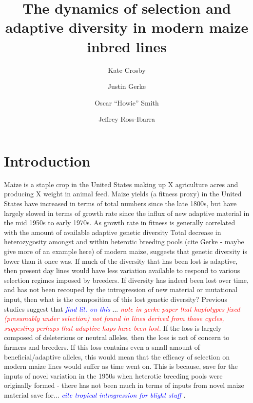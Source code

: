 \documentclass[9pt,twocolumn,twoside]{gsajnl}
\title{The dynamics of selection and adaptive diversity in modern maize inbred lines}
\author[$\ast$,1]{Kate Crosby}
\author[$\S$]{Justin Gerke}
\author[$\dagger$]{Oscar ``Howie'' Smith}
\author[$\ddagger$,1]{Jeffrey Ross-Ibarra}
\affil[$\ast$]{Author one affiliation}
\affil[$\S$]{Author two affiliation}
\affil[$\dagger$]{Author three affiliation}
\affil[$\ddagger$]{Author four affiliation}
\newcommand{\jri}[1]{\textcolor{red}{ \emph{ #1}} }
\newcommand{\kc}[1]{\textcolor{blue}{ \emph{ #1}} }
\begin{document}
\maketitle
\thispagestyle{firststyle}
\marginmark
\firstpagefootnote
{}
\vspace{-11pt}%




\section*{Introduction}

\lettrine[lines=2]{\color{color2}M}{}aize is a staple crop in the United States making up X agriculture acres and producing X weight in animal feed. 
Maize yields (a fitness proxy) in the United States have increased in terms of total numbers since the late 1800s, but have largely slowed in terms of growth rate since the influx of new adaptive material in the mid 1950s to early 1970s. As growth rate in fitness is generally correlated with the amount of available adaptive genetic diversity 
Total decrease in heterozygosity amongst and within heterotic breeding pools (cite Gerke - maybe give more of an example here) of modern maize, suggests that genetic diversity is lower than it once was. 
If much of the diversity that has been lost is adaptive, then present day lines would have less variation available to respond to various selection regimes imposed by breeders. 
If diversity has indeed been lost over time, and has not been recouped by the introgression of new material or mutational input, then what is the composition of this lost genetic diversity? Previous studies suggest that \kc{find lit. on this}...
\jri{note in gerke paper that haplotypes fixed (presumably under selection) not found in lines derived from those cycles, suggesting perhaps that adaptive haps have been lost.}
If the loss is largely composed of deleterious or neutral alleles, then the loss is not of concern to farmers and breeders. 
If this loss contains even a small amount of beneficial/adaptive alleles, this would mean that the efficacy of selection on modern maize lines would suffer as time went on. 
This is because, save for the inputs of novel variation in the 1950s when heterotic breeding pools were originally formed - there has not been much in terms of inputs from novel maize material save for... \kc{cite tropical introgression for blight stuff}.
\end{document}
